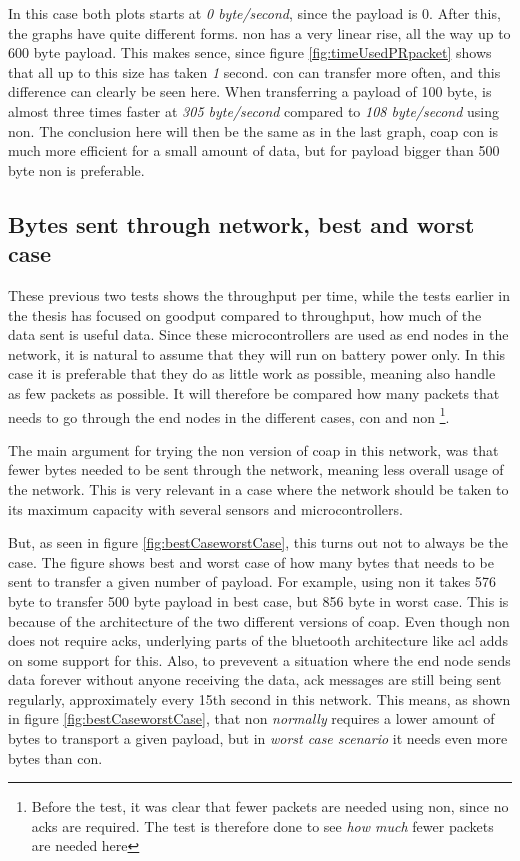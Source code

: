 In this case both plots starts at \textit{0 byte/second}, since the payload is 0. After this, the graphs have quite different forms. \gls{non} has a very linear rise, all the way up to 600 byte payload. This makes sence, since figure \ref{fig:timeUsedPRpacket} shows that all up to this size has taken \textit{1} second. \gls{con} can transfer more often, and this difference can clearly be seen here. When transferring a payload of 100 byte, is almost three times faster at \textit{305 byte/second} compared to \textit{108 byte/second} using \gls{non}. The conclusion here will then be the same as in the last graph, \gls{coap} \gls{con} is much more efficient for a small amount of data, but for payload bigger than 500 byte \gls{non} is preferable. 


\subsection{Bytes sent through network, best and worst case}

These previous two tests shows the throughput per time, while the tests earlier in the thesis has focused on goodput compared to throughput, how much of the data sent is useful data. Since these \glspl{microcontroller} are used as end nodes in the network, it is natural to assume that they will run on battery power only. In this case it is preferable that they do as little work as possible, meaning also handle as few packets as possible. It will therefore be compared how many packets that needs to go through the end nodes in the different cases, \gls{con} and \gls{non} \footnote{Before the test, it was clear that fewer packets are needed using \gls{non}, since no \glspl{ack} are required. The test is therefore done to see \textit{how much} fewer packets are needed here}.

The main argument for trying the \gls{non} version of \gls{coap} in this network, was that fewer bytes needed to be sent through the network, meaning less overall usage of the network. This is very relevant in a case where the network should be taken to its maximum capacity with several sensors and \glspl{microcontroller}. 

But, as seen in figure \ref{fig:bestCaseworstCase}, this turns out not to always be the case. The figure shows best and worst case of how many bytes that needs to be sent to transfer a given number of \gls{payload}. For example, using \gls{non} it takes 576 byte to transfer 500 byte payload in best case, but 856 byte in worst case. This is because of the architecture of the two different versions of \gls{coap}. Even though \gls{non} does not require \glspl{ack}, underlying parts of the bluetooth architecture like \gls{acl} adds on some support for this. Also, to prevevent a situation where the end node sends data forever without anyone receiving the data, \gls{ack} messages are still being sent regularly, approximately every 15th second in this network. This means, as shown in figure \ref{fig:bestCaseworstCase}, that \gls{non} \textit{normally} requires a lower amount of bytes to transport a given \gls{payload}, but in \textit{worst case scenario} it needs even more bytes than \gls{con}. 



